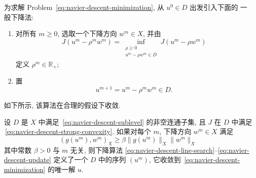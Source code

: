 为求解 Problem~\eqref{eq:navier-descent-minimization}, 从 $u^0\in D$ 出发引入下面的
一般下降法:
\begin{enumerate}
\item[1$^\circ$)] 对所有 $m\geq0$, 选取一个下降方向 $w^m\in X$, 并由
\begin{equation}
\label{eq:navier-descent-line-search}
J(u^m-\rho^mw^m)
=\inf_{\substack{\rho\geq0\\u^m-\rho w^m\in D}}J(u^m-\rho w^m)
\end{equation}
定义 $\rho^m\in\mathbb R_+$;
\item[2$^\circ$)] 置
\begin{equation}
\label{eq:navier-descent-update}
u^{m+1}=u^m-\rho^mw^m\in D.
\end{equation}
\end{enumerate}
如下所示, 该算法在合理的假设下收敛.

\setcounter{statement}{0}
\begin{Theorem}
\label{thm:navier-general-descent-convergence}
设 $D$ 是 $X$ 中满足 \,\eqref{eq:navier-descent-sublevel} 的非空连通子集, 且 $J$
在 $D$ 中满足 \,\eqref{eq:navier-descent-strong-convexity}. 如果对每个 $m$, 下降方向
$w^m\in X$ 满足
\begin{equation}
\label{eq:navier-descent-angle-condition}
(g(u^m),w^m)_X\geq\beta\|g(u^m)\|_X\|w^m\|_X
\end{equation}
其中常数 $\beta>0$ 与 $m$ 无关, 则下降算法
\eqref{eq:navier-descent-line-search}--\eqref{eq:navier-descent-update} 定义了一个
$D$ 中的序列 $(u^m)$, 它收敛到 \,\eqref{eq:navier-descent-minimization} 的唯一解 $u$.
\end{Theorem}

